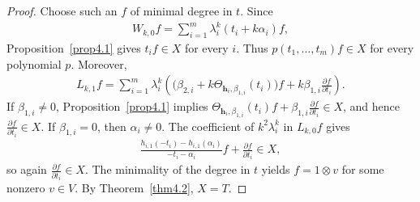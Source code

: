 \documentclass[a4paper]{amsart}
\numberwithin{equation}{section}
\begin{document}
\begin{proof}
Choose such an $f$ of minimal degree in $t$. Since
\begin{align*}
W_{k,0}f=\sum_{i=1}^m\lambda_i^k(t_i+k\alpha_i)f,
\end{align*}
Proposition~\ref{prop4.1} gives $t_if\in X$ for every $i$. Thus $p(t_1,\ldots,t_m)f\in X$ for every polynomial $p$. Moreover,
\begin{align*}
L_{k,1}f=\sum_{i=1}^m\lambda_i^k\left(
\bigl(\beta_{2,i}+k\Theta_{\mathbf h_i,\beta_{1,i}}(t_i)\bigr)f
+k\beta_{1,i}\frac{\partial f}{\partial t_i}\right).
\end{align*}
If $\beta_{1,i}\neq0$, Proposition~\ref{prop4.1} implies
$\Theta_{\mathbf h_i,\beta_{1,i}}(t_i)f+\beta_{1,i}\frac{\partial f}{\partial t_i}\in X$, and hence $\frac{\partial f}{\partial t_i}\in X$. If $\beta_{1,i}=0$, then $\alpha_i\neq0$. The coefficient of $k^2\lambda_i^k$ in $L_{k,0}f$ gives
\begin{align*}
\frac{h_{i,1}(-t_i)-h_{i,1}(\alpha_i)}{-t_i-\alpha_i}f
+\frac{\partial f}{\partial t_i}\in X,
\end{align*}
so again $\frac{\partial f}{\partial t_i}\in X$. The minimality of the degree in $t$ yields $f=1\otimes v$ for some nonzero $v\in V$. By Theorem~\ref{thm4.2}, $X=T$.
\end{proof}
\end{document}
